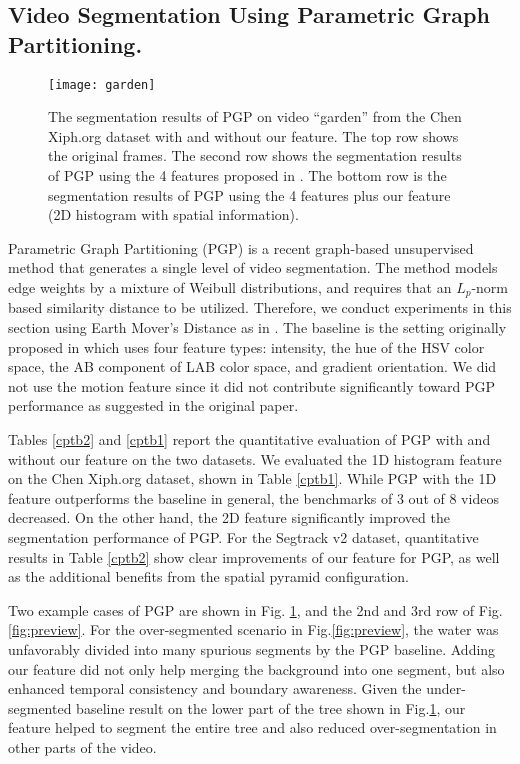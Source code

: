 \documentclass[runningheads]{llncs}
\begin{document}
\subsection{Video Segmentation Using Parametric Graph Partitioning.}

\begin{figure}[h]
\begin{center}
\texttt{[image: garden]}
\end{center}
\caption{The segmentation results of PGP on video ``garden'' from the Chen Xiph.org dataset with and without our feature. The top row shows the original frames. The second row shows the segmentation results of PGP using the 4 features proposed in \cite{Yu_2015_ICCV}. The bottom row is the segmentation results of PGP using the 4 features plus our feature (2D histogram with spatial information).}
\label{fig:cpygd}
\end{figure}

Parametric Graph Partitioning (PGP) \cite{Yu_2015_ICCV} is a recent graph-based unsupervised method that generates a single level of video segmentation. The method models edge weights by a mixture of Weibull distributions, and requires that an $L_p$-norm based similarity distance to be utilized. Therefore, we conduct experiments in this section using Earth Mover's Distance as in \cite{Yu_2015_ICCV}. 
The baseline is the setting originally proposed in \cite{Yu_2015_ICCV} which uses four feature types: intensity, the hue of the HSV color space, the AB component of LAB color space, and gradient orientation. We did not use the motion feature since it did not contribute  significantly toward PGP performance as suggested in the original paper. 

Tables \ref{cptb2} and \ref{cptb1} report the quantitative evaluation of PGP with and without our feature on the two datasets.  
We evaluated the 1D histogram feature on the Chen Xiph.org dataset, shown in Table \ref{cptb1}. While PGP with the 1D feature outperforms the baseline in general, the benchmarks of 3 out of 8 videos decreased. On the other hand, the 2D feature significantly improved the segmentation performance of PGP. For the Segtrack v2 dataset, quantitative results in Table \ref{cptb2} show clear improvements of our feature for PGP, as well as the additional benefits from the spatial pyramid configuration.

Two example cases of PGP are shown in Fig. \ref{fig:cpygd}, and the 2nd and 3rd row of Fig. \ref{fig:preview}. For the over-segmented scenario in Fig.\ref{fig:preview}, the water was unfavorably divided into many spurious segments by the PGP baseline. Adding our feature did not only help merging the background into one segment, but also enhanced temporal consistency and boundary awareness. Given the under-segmented baseline result on the lower part of the tree shown in Fig.\ref{fig:cpygd}, our feature helped to segment the entire tree and also reduced over-segmentation in other parts of the video.
\end{document}
